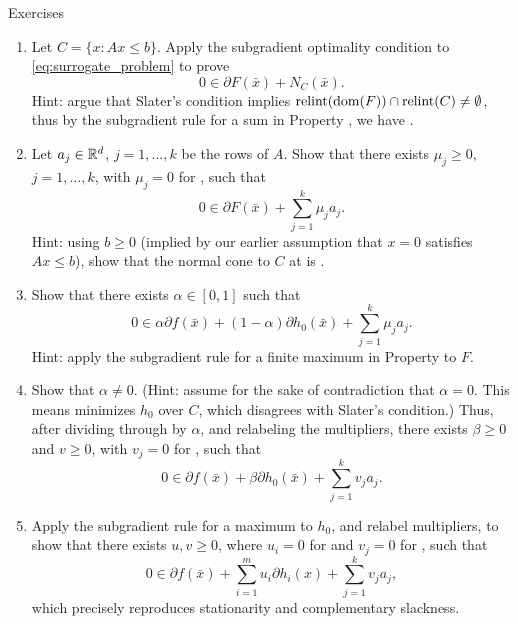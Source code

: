 \begin{xcb}{Exercises}
\begin{enumerate}[label=\thechapter.\arabic*]
\begin{enumerate}[label=\alph*.]
\item Let $C = \{x : Ax \leq b\}$. Apply the subgradient optimality condition to
  \eqref{eq:surrogate_problem} to prove
  \[
  0 \in \partial F(\bar{x}) + N_C(\bar{x}).
  \]
  Hint: argue that Slater's condition implies $\operatorname{relint}(\operatorname{dom}(F)) \cap \operatorname{relint}(C)
  \not= \emptyset$, thus by the subgradient rule for a sum in Property
  , we have . 

\item Let $a_j \in \mathbb{R}^d$, $j = 1,\dots,k$ be the rows of $A$. Show that there
  exists $\mu_j \geq 0$, $j = 1,\dots,k$, with $\mu_j = 0$ for , such that   
  \[
  0 \in \partial F(\bar{x}) + \sum_{j=1}^k \mu_j a_j.
  \]
  Hint: using $b \geq 0$ (implied by our earlier assumption that $x = 0$
  satisfies $Ax \leq b$), show that the normal cone to $C$ at  
  is .     

\item Show that there exists $\alpha \in [0,1]$ such that 
  \[
  0 \in \alpha \partial f(\bar{x}) + (1-\alpha) \partial h_0(\bar{x}) +
  \sum_{j=1}^k \mu_j a_j. 
  \]
  Hint: apply the subgradient rule for a finite maximum in Property 
   to $F$. 

\item Show that $\alpha \not= 0$. (Hint: assume for the sake of contradiction
  that $\alpha = 0$. This means  minimizes $h_0$ over $C$,
  which disagrees with Slater's condition.) Thus, after dividing through by
  $\alpha$, and relabeling the multipliers, there exists $\beta \geq 0$ and $v
  \geq 0$, with $v_j = 0$ for , such that     
  \[
  0 \in \partial f(\bar{x}) + \beta \partial h_0(\bar{x}) + \sum_{j=1}^k v_j
  a_j.  
  \]

\item Apply the subgradient rule for a maximum to $h_0$, and relabel
  multipliers, to show that there exists $u,v \geq 0$, where $u_i = 0$ for
   and $v_j = 0$ for ,
  such that  
  \[
  0 \in \partial f(\bar{x}) + \sum_{i=1}^m u_i \partial h_i(x) + \sum_{j=1}^k
  v_j a_j, 
  \]
  which precisely reproduces stationarity and complementary slackness.
\end{enumerate}
\end{enumerate}
\end{xcb}